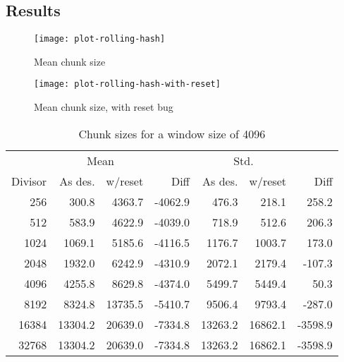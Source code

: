 \subsection{Results}
\label{results-rolling-hash}

\begin{figure}[p]
    \caption{Mean chunk size}
    \label{plot-rolling-hash}
    \centering
    \texttt{[image: plot-rolling-hash]}
\end{figure}

\begin{figure}[p]
    \caption{Mean chunk size, with reset bug}
    \label{plot-rolling-hash-with-reset}
    \centering
    \texttt{[image: plot-rolling-hash-with-reset]}
\end{figure}

%

%

\begin{table}
    \caption{Chunk sizes for a window size of 4096}
    \label{chunk-size-table}
    \begin{tabular}{r | r r r | r r r}
        & \multicolumn{2}{c}{Mean} & & \multicolumn{2}{c}{Std.} & \\
        Divisor & As des. & w/reset & Diff & As des. & w/reset & Diff \\
        \midrule
    256 &    300.8 &   4363.7 &  -4062.9 &   476.3 &   218.1 &   258.2 \\
    512 &    583.9 &   4622.9 &  -4039.0 &   718.9 &   512.6 &   206.3 \\
   1024 &   1069.1 &   5185.6 &  -4116.5 &  1176.7 &  1003.7 &   173.0 \\
   2048 &   1932.0 &   6242.9 &  -4310.9 &  2072.1 &  2179.4 &  -107.3 \\
   4096 &   4255.8 &   8629.8 &  -4374.0 &  5499.7 &  5449.4 &    50.3 \\
   8192 &   8324.8 &  13735.5 &  -5410.7 &  9506.4 &  9793.4 &  -287.0 \\
  16384 &  13304.2 &  20639.0 &  -7334.8 & 13263.2 & 16862.1 & -3598.9 \\
  32768 &  13304.2 &  20639.0 &  -7334.8 & 13263.2 & 16862.1 & -3598.9 \\
    \end{tabular}
\end{table}

